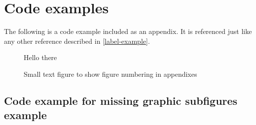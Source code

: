 \chapter{Code examples}
The following is a code example included as an appendix.
It is referenced just like any other reference described in \cref{label-example}.

\begin{figure}
    \centering
    Hello there
    \caption{Small text figure to show figure numbering in appendixes}
    \label{}
\end{figure}


\section{Code example for missing graphic subfigures example}
\label{code-missing-graphic-subfigures-example}
